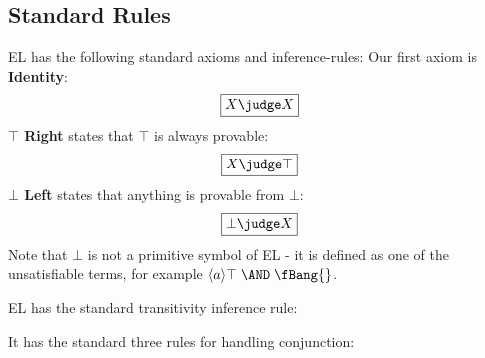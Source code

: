 \subsection{Standard Rules}
EL has the following standard axioms and inference-rules:
Our first axiom is {\bf Identity}:
\[
\boxed
{
X \judge X
}
\]
{\bf $\top$ Right} states that $\top$ is always provable:
\[
\boxed
{
X \judge \top
}
\]
{\bf $\bot$ Left} states that anything is provable from $\bot$:
\[
\boxed
{
\bot \judge X
}
\]
Note that $\bot$ is not a primitive symbol of EL - it is defined as one of the unsatisfiable terms, for example $\langle a \rangle \top \; \AND \; \fBang \{\}$. 

EL has the standard transitivity inference rule:
\begin{center}
\end{center}
It has the standard three rules for handling conjunction:
\begin{center}
\end{center}

\begin{center}
\end{center}

\begin{center}
\end{center}

